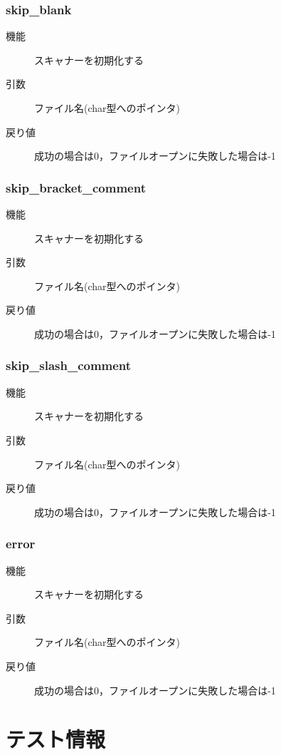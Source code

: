\documentclass{jlreq}
\begin{document}
\subsubsection{skip\_blank}
\begin{description}
  \item[機能] スキャナーを初期化する
  \item[引数] ファイル名(char型へのポインタ)
  \item[戻り値] 成功の場合は0，ファイルオープンに失敗した場合は-1
\end{description}

\subsubsection{skip\_bracket\_comment}
\begin{description}
  \item[機能] スキャナーを初期化する
  \item[引数] ファイル名(char型へのポインタ)
  \item[戻り値] 成功の場合は0，ファイルオープンに失敗した場合は-1
\end{description}

\subsubsection{skip\_slash\_comment}
\begin{description}
  \item[機能] スキャナーを初期化する
  \item[引数] ファイル名(char型へのポインタ)
  \item[戻り値] 成功の場合は0，ファイルオープンに失敗した場合は-1
\end{description}

\subsubsection{error}
\begin{description}
  \item[機能] スキャナーを初期化する
  \item[引数] ファイル名(char型へのポインタ)
  \item[戻り値] 成功の場合は0，ファイルオープンに失敗した場合は-1
\end{description}


\section{テスト情報}
\end{document}
